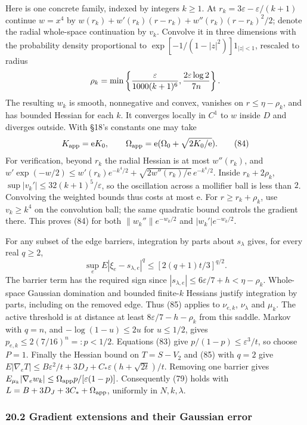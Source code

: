 \documentclass[11pt,a4paper]{article}
\begin{document}
Here is one concrete family, indexed by integers \(k\ge1\). At
\(r_k=3\varepsilon-\varepsilon/(k+1)\) continue \(w=x^4\) by
\(w(r_k)+w'(r_k)(r-r_k)+w''(r_k)(r-r_k)^2/2\); denote the radial
whole-space continuation by \(v_k\). Convolve it in three dimensions
with the probability density proportional to
\(\exp[-1/(1-|z|^2)]1_{|z|<1}\), rescaled to radius
\[\rho_k=\min\left\{{\varepsilon\over1000(k+1)^6},
 {2\varepsilon\log2\over7n}\right\}.\] The resulting \(w_k\) is smooth,
nonnegative and convex, vanishes on \(r\le\eta-\rho_k\), and has bounded
Hessian for each \(k\). It converges locally in \(C^1\) to \(w\) inside
\(D\) and diverges outside. With §18's constants one may take
\[K_{\rm app}=\mathrm eK_0,\qquad
\Omega_{\rm app}=\mathrm e(\Omega_0+\sqrt{2K_0/\mathrm e}).\tag{84}\]
For verification, beyond \(r_k\) the radial Hessian is at most
\(w''(r_k)\), and
\(w'\exp(-w/2)\le w'(r_k)e^{-k^4/2} +\sqrt{2w''(r_k)/\mathrm e}\,e^{-k^4/2}\).
Inside \(r_k+2\rho_k\), \(\sup|v_k'|\le32(k+1)^5/\varepsilon\), so the
oscillation across a mollifier ball is less than \(2\). Convolving the
weighted bounds thus costs at most \(\mathrm e\). For
\(r\ge r_k+\rho_k\), use \(v_k\ge k^4\) on the convolution ball; the
same quadratic bound controls the gradient there. This proves (84) for
both \(\|w_k''\|e^{-w_k/2}\) and \(|w_k'|e^{-w_k/2}\).

For any subset of the edge barriers, integration by parts about
\(s_\lambda\) gives, for every real \(q\ge2\),
\[\sup_e E|\xi_e-s_{\lambda,e}|^q
 \le[2(q+1)t/3]^{q/2}.\tag{85}\] The barrier term has the required sign
since \(|s_{\lambda,e}|\le6\varepsilon/7+h<\eta-\rho_k\). Whole-space
Gaussian domination and bounded finite-\(k\) Hessians justify
integration by parts, including on the removed edge. Thus (85) applies
to \(\nu_{e,k}\), \(\nu_\lambda\) and \(\mu_k\). The active threshold is
at distance at least \(8\varepsilon/7-h-\rho_k\) from this saddle.
Markov with \(q=n\), and \(-\log(1-u)\le2u\) for \(u\le1/2\), gives
\(p_{e,k}\le2(7/16)^n=:p<1/2\). Equations (83) give
\(p/(1-p)\le\varepsilon^3/t\), so choose \(P=1\). Finally the Hessian
bound on \(T=S-V_2\) and (85) with \(q=2\) give
\(E|\nabla_eT|\le B\varepsilon^2/t+3D_J+ C_*\varepsilon(h+\sqrt{2t})/t\).
Removing one barrier gives
\(E_{\mu_k}|\nabla_ew_k|\le\Omega_{\rm app}p/[\varepsilon(1-p)]\).
Consequently (79) holds with \(L=B+3D_J+3C_*+\Omega_{\rm app}\),
uniformly in \(N,k,\lambda\).

\hypertarget{gradient-extensions-and-their-gaussian-error}{%
\subsubsection{20.2 Gradient extensions and their Gaussian
error}\label{gradient-extensions-and-their-gaussian-error}}
\end{document}
